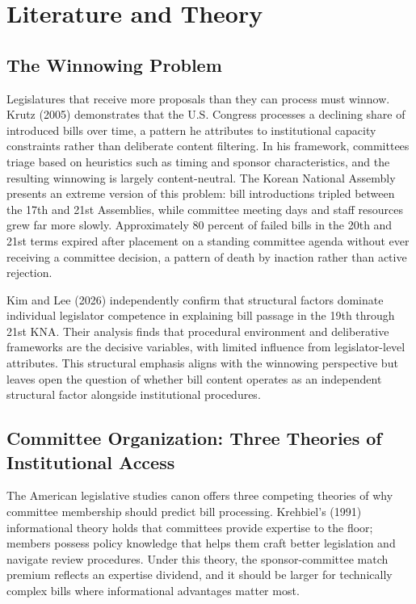 \documentclass[11pt]{article}
\begin{document}
\section{Literature and Theory}

\subsection{The Winnowing Problem}

Legislatures that receive more proposals than they can process must winnow. Krutz (2005) demonstrates that the U.S. Congress processes a declining share of introduced bills over time, a pattern he attributes to institutional capacity constraints rather than deliberate content filtering. In his framework, committees triage based on heuristics such as timing and sponsor characteristics, and the resulting winnowing is largely content-neutral. The Korean National Assembly presents an extreme version of this problem: bill introductions tripled between the 17th and 21st Assemblies, while committee meeting days and staff resources grew far more slowly. Approximately 80 percent of failed bills in the 20th and 21st terms expired after placement on a standing committee agenda without ever receiving a committee decision, a pattern of death by inaction rather than active rejection.

Kim and Lee (2026) independently confirm that structural factors dominate individual legislator competence in explaining bill passage in the 19th through 21st KNA. Their analysis finds that procedural environment and deliberative frameworks are the decisive variables, with limited influence from legislator-level attributes. This structural emphasis aligns with the winnowing perspective but leaves open the question of whether bill content operates as an independent structural factor alongside institutional procedures.

\subsection{Committee Organization: Three Theories of Institutional Access}

The American legislative studies canon offers three competing theories of why committee membership should predict bill processing. Krehbiel's (1991) informational theory holds that committees provide expertise to the floor; members possess policy knowledge that helps them craft better legislation and navigate review procedures. Under this theory, the sponsor-committee match premium reflects an expertise dividend, and it should be larger for technically complex bills where informational advantages matter most.
\end{document}
